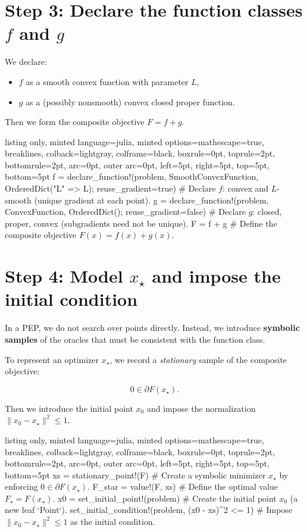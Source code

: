 \documentclass{article}
\begin{document}
\section{Step 3: Declare the function classes $f$ and $g$}

We declare:

\begin{itemize}
\item $f$ as a smooth convex function with parameter $L$,
\item $g$ as a (possibly nonsmooth) convex closed proper function.
\end{itemize}

Then we form the composite objective $F = f + g$.

\begin{tcblisting}{listing only, minted language=julia, minted options={mathescape=true, breaklines}, colback=lightgray, colframe=black, boxrule=0pt, toprule=2pt, bottomrule=2pt, arc=0pt, outer arc=0pt, left=5pt, right=5pt, top=5pt, bottom=5pt}
f = declare_function!(problem, SmoothConvexFunction, OrderedDict("L" => L); reuse_gradient=true) # Declare $f$: convex and $L$-smooth (unique gradient at each point).
g = declare_function!(problem, ConvexFunction, OrderedDict(); reuse_gradient=false) # Declare $g$: closed, proper, convex (subgradients need not be unique).
F = f + g # Define the composite objective $F(x)=f(x)+g(x)$.
\end{tcblisting}


\section{Step 4:  Model $x_\star$ and impose the initial condition}

In a PEP, we do not search over points directly. Instead, we introduce \textbf{symbolic samples} of the oracles that must be consistent with the function class.

To represent an optimizer $x_\star$, we record a \emph{stationary} sample of the composite objective:

\begin{equation*}
0 \in \partial F(x_\star).
\end{equation*}

Then we introduce the initial point $x_0$ and impose the normalization $\|x_0-x_\star\|^2 \le 1$.

\begin{tcblisting}{listing only, minted language=julia, minted options={mathescape=true, breaklines}, colback=lightgray, colframe=black, boxrule=0pt, toprule=2pt, bottomrule=2pt, arc=0pt, outer arc=0pt, left=5pt, right=5pt, top=5pt, bottom=5pt}
xs = stationary_point!(F) # Create a symbolic minimizer $x_\star$ by enforcing $0 \in \partial F(x_\star)$.
F_star = value!(F, xs) # Define the optimal value $F_\star = F(x_\star)$.
x0 = set_initial_point!(problem) # Create the initial point $x_0$ (a new leaf `Point`).
set_initial_condition!(problem, (x0 - xs)^2 <= 1) # Impose $\|x_0-x_\star\|^2 \le 1$ as the initial condition.
\end{tcblisting}
\end{document}
